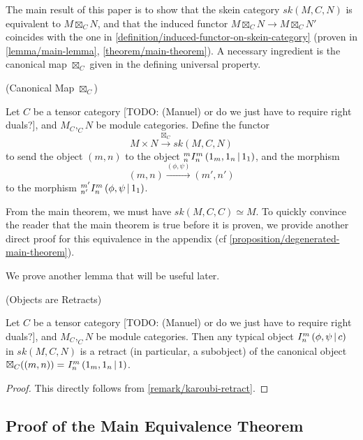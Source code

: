 \noindent The main result of this paper is to show that the skein category
$sk(M,C,N)$ is equivalent to $M \boxtimes_{C} N$, and that the induced functor $M \boxtimes_{C} N \to M \boxtimes_{C} N'$
coincides with the one in \ref{definition/induced-functor-on-skein-category}
(proven in \ref{lemma/main-lemma}, \ref{theorem/main-theorem}). A necessary
ingredient is the canonical map $\boxtimes_{C}$ given in the defining universal
property.

\begin{definition}\label{definition/canonical-map} (Canonical Map $\boxtimes_{C}$)

  \noindent Let $C$ be a tensor category [TODO: (Manuel) or do we just have to require right duals?], and $M_{C}, _{C}N$ be module
  categories. \quad Define the functor
  \[
    M \times N \xrightarrow{\boxtimes_{C}} sk(M,C,N)
  \]
  to send the object $(m,n)$ to the object ${}^{m}_{n} I^{m}_{n} \left( 1_{m}, 1_{n} \,\middle|\, 1_{1} \right)$, and the morphism
  \[
    (m,n) \xrightarrow{(\phi, \psi)} (m', n')
  \]
  to the morphism ${}^{m'}_{n'} I^{m}_{n} \left( \phi, \psi \,\middle|\, 1_{1} \right)$.
\end{definition}

\noindent From the main theorem, we must have $sk(M,C,C) \simeq M$. To quickly
convince the reader that the main theorem is true before it is proven, we
provide another direct proof for this equivalence in the appendix (cf
\ref{proposition/degenerated-main-theorem}).

\hfill\break
\noindent We prove another lemma that will be useful later.

\begin{lemma}\label{lemma/I-provides-subobject} (Objects are Retracts)

  \noindent Let $C$ be a tensor category [TODO: (Manuel) or do we just have to require right duals?], and $M_{C}, _{C}N$ be module
  categories. \quad Then any typical object ${}^{}_{} I^{m}_{n} \left( \phi, \psi \,\middle|\, c \right)$ in
  $sk(M,C,N)$ is a retract (in particular, a subobject) of the canonical
  object $\boxtimes_{C}((m,n)) = {}^{}_{} I^{m}_{n} \left( 1_{m}, 1_{n} \,\middle|\, 1 \right)$.
\end{lemma}
\begin{proof}
  This directly follows from \ref{remark/karoubi-retract}.
\end{proof}



\subsection{Proof of the Main Equivalence Theorem}\label{section/proof-of-equivalence}

